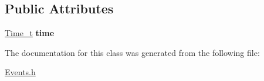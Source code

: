 \subsection*{Public Attributes}
\begin{DoxyCompactItemize}
\item 
\hypertarget{class_event_base_aa12d9278a8b9577b1a19099963a75702}{\hyperlink{_common_defs_8h_a80b23eab88362163e2edd1a8b8238ef1}{Time\-\_\-t} {\bfseries time}}\label{class_event_base_aa12d9278a8b9577b1a19099963a75702}

\end{DoxyCompactItemize}


The documentation for this class was generated from the following file\-:\begin{DoxyCompactItemize}
\item 
\hyperlink{_events_8h}{Events.\-h}\end{DoxyCompactItemize}

